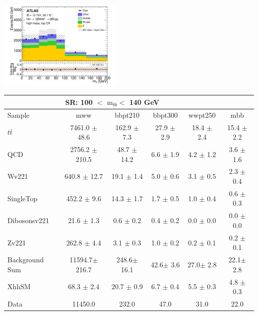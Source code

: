 \documentclass{beamer}
\newcommand*{\ttbar}{\ensuremath{t\bar{t}}\xspace}
\newcommand*{\mbb}{\ensuremath{\text{m}_{bb}}\xspace}
\newcommand*{\header}[1]{\fontsize{16}{8}\selectfont \textbf{{\color{MyPurple}{#1}}}}
\begin{document}
\begin{frame}
\begin{columns}
\end{columns}
\begin{center}
\vspace{-0.3cm}\includegraphics[width=0.45\textwidth]{figures/C_mBBcr_reOpt2000_bbpt350_wlepmtben_regionA_met25d020-eps-converted-to}
\end{center}
\end{frame}

\begin{frame}
\begin{center}
\header{Non-Res SR}
\end{center}
\begin{table}
\tiny
 \begin{tabular}{l|c|c|c|c|c}
\hline\hline
\multicolumn{5}{c}{\textbf{SR}: 100 $<$ \mbb $<$ 140 GeV}\\\hline\hline
Sample  	& mww 	& bbpt210 	& bbpt300 	& wwpt250 	& mbb  \\\hline
\ttbar 	& 7461.0 $\pm$ 48.6 	& 162.9 $\pm$ 7.3 	& 27.9 $\pm$ 2.9 	& 18.4 $\pm$ 2.4 	& 15.4 $\pm$ 2.2	\\\hline 
QCD 	& 2756.2 $\pm$ 210.5 	& 48.7 $\pm$ 14.2 	& 6.6 $\pm$ 1.9 	& 4.2 $\pm$ 1.2 	& 3.6 $\pm$ 1.6	\\\hline 
Wv221 	& 640.8 $\pm$ 12.7 	& 19.1 $\pm$ 1.4 	& 5.0 $\pm$ 0.6 	& 3.1 $\pm$ 0.5 	& 2.3 $\pm$ 0.4	\\\hline 
SingleTop 	& 452.2 $\pm$ 9.6 	& 14.3 $\pm$ 1.7 	& 1.7 $\pm$ 0.5 	& 1.0 $\pm$ 0.4 	& 0.6 $\pm$ 0.3	\\\hline 
Dibosonsv221 	& 21.6 $\pm$ 1.3 	& 0.6 $\pm$ 0.2 	& 0.4 $\pm$ 0.2 	& 0.0 $\pm$ 0.0 	& 0.0 $\pm$ 0.0	\\\hline 
Zv221 	& 262.8 $\pm$ 4.4 	& 3.1 $\pm$ 0.3 	& 1.0 $\pm$ 0.2 	& 0.2 $\pm$ 0.1 	& 0.2 $\pm$ 0.1	\\\hline 
\hline
Background Sum 	& 11594.7$\pm$ 216.7 	& 248.6$\pm$ 16.1 	& 42.6$\pm$ 3.6 	& 27.0$\pm$ 2.8 	& 22.1$\pm$ 2.8	\\\hline 
\hline
XhhSM 	& 68.3 $\pm$ 2.4 	& 20.7 $\pm$ 0.9 	& 6.7 $\pm$ 0.4 	& 5.5 $\pm$ 0.3 	& 4.8 $\pm$ 0.3	\\\hline 
Data 	& 11450.0 	& 232.0 	& 47.0 	& 31.0 	& 22.0	\\\hline 
\end{tabular}
\end{table}
\end{frame}
\end{document}
